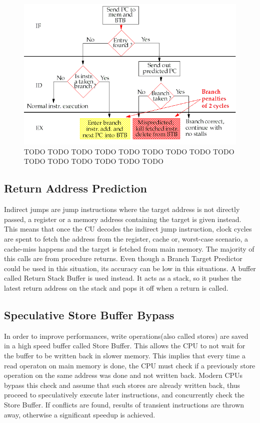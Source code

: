 \begin{figure}
    \includegraphics[scale=0.35]{img/BTB.png}
    \caption{TODO TODO TODO TODO TODO TODO TODO TODO TODO TODO TODO TODO TODO TODO TODO }
\end{figure}

\subsection{Return Address Prediction}
Indirect jumps are jump instructions where the target address is not directly passed, a register or a memory address containing the target is given instead.
This means that once the CU decodes the indirect jump instruction, clock cycles are spent to fetch the address from the register, cache or, worst-case scenario, a cache-miss happens and the target is fetched from main memory.
The majority of this calls are from procedure returns. Even though a Branch Target Predictor could be used in this situation, its accuracy can be low in this situations. A buffer called Return Stack Buffer is used instead. It acts as a stack, so it pushes the latest return address on the stack and pops it off when a return is called.

\subsection{Speculative Store Buffer Bypass}
In order to improve performances, write operations(also called stores) are saved in a high speed buffer called Store Buffer. This allows the CPU to not wait for the buffer to be written back in slower memory.
This implies that every time a read operaton on main memory is done, the CPU must check if a previously store operation on the same address was done and not written back. 
Modern CPUs bypass this check and assume that such stores are already written back, thus proceed to speculatively execute later instructions, and concurrently check the Store Buffer.
If conflicts are found, results of transient instructions are thrown away, otherwise a significant speedup is achieved.
